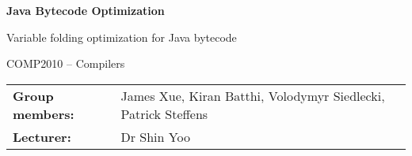 \thispagestyle{empty}
\mbox{}
\vspace{1cm}
\begin{center}
\begin{Huge}
\textbf{Java Bytecode Optimization}\\
\vspace{6mm}
\end{Huge}
{\Large Variable folding optimization for Java bytecode}\\

\vspace{20mm}
\begin{Large}
COMP2010 -- Compilers
\end{Large}


\vspace{11cm}
\hspace{3cm}
\begin{tabular}{ll}
\centering
{\textbf{Group members:}} & James Xue, Kiran Batthi, Volodymyr Siedlecki, Patrick Steffens\\
{\textbf{Lecturer:}} & Dr Shin Yoo

\end{tabular}

\end{center}
